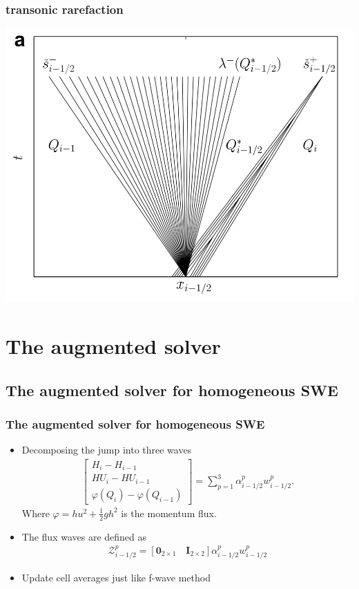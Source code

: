 \documentclass{beamer}
\begin{document}
\frame
{
\frametitle{transonic rarefaction}
\includegraphics[width=0.83\linewidth]{transonic.png}
}

\section{The augmented solver}
\subsection{The augmented solver for homogeneous SWE}
\frame
{
\frametitle{The augmented solver for homogeneous SWE}
\begin{itemize}
\item<1-> Decomposing the jump into three waves
\begin{align*}
\begin{bmatrix}
H_i-H_{i-1}\\
HU_i-HU_{i-1}\\
\varphi(Q_i)-\varphi(Q_{i-1})
\end{bmatrix}=\sum_{p=1}^3 \alpha_{i-1/2}^p w_{i-1/2}^p.
\end{align*}
Where $\varphi=h u^2+\frac{1}{2} g h^2$ is the momentum flux.
\item<2-> 
The flux waves are defined as
\begin{align*}
\mathcal{Z}_{i-1/2}^p =\left[\mathbf{0}_{2\times1} \quad \mathbf{I}_{2\times2}\right] \alpha_{i-1/2}^p w_{i-1/2}^p
\end{align*}
\item<3-> Update cell averages just like f-wave method
\end{itemize}
}
\end{document}
